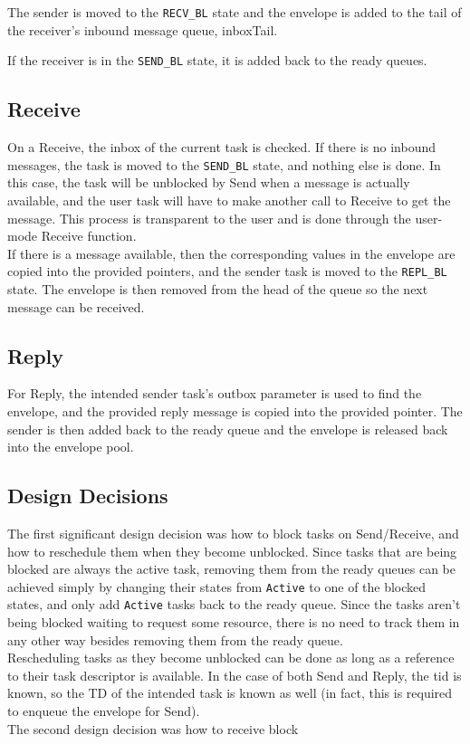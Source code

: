 \documentclass[12pt]{article}
\begin{document}
The sender is moved to the \texttt{RECV\_BL} state and the envelope is added to the tail of the receiver's inbound message queue, inboxTail.

If the receiver is in the \texttt{SEND\_BL} state, it is added back to the ready queues.
\subsection{Receive}
On a Receive, the inbox of the current task is checked. If there is no inbound messages, the task is moved to the \texttt{SEND\_BL} state, and nothing else is done. In this case, the task will be unblocked by Send when a message is actually available, and the user task will have to make another call to Receive to get the message. This process is transparent to the user and is done through the user-mode Receive function.
\\
If there is a message available, then the corresponding values in the envelope are copied into the provided pointers, and the sender task is moved to the \texttt{REPL\_BL} state. The envelope is then removed from the head of the queue so the next message can be received.
\subsection{Reply}
For Reply, the intended sender task's outbox parameter is used to find the envelope, and the provided reply message is copied into the provided pointer. The sender is then added back to the ready queue and the envelope is released back into the envelope pool.
\subsection{Design Decisions}
The first significant design decision was how to block tasks on Send/Receive, and how to reschedule them when they become unblocked. Since tasks that are being blocked are always the active task, removing them from the ready queues can be achieved simply by changing their states from \texttt{Active} to one of the blocked states, and only add \texttt{Active} tasks back to the ready queue. Since the tasks aren't being blocked waiting to request some resource, there is no need to track them in any other way besides removing them from the ready queue.
\\
Rescheduling tasks as they become unblocked can be done as long as a reference to their task descriptor is available. In the case of both Send and Reply, the tid is known, so the TD of the intended task is known as well (in fact, this is required to enqueue the envelope for Send).
\\
The second design decision was how to receive block
\end{document}
